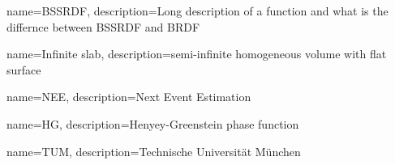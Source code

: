 {
    name={BSSRDF},
    description={Long description of a function and what is the differnce
    between BSSRDF and BRDF}
}

{
    name={Infinite slab},
    description={semi-infinite homogeneous volume with flat surface}
}

{
    name={NEE},
    description={Next Event Estimation}
}

{
    name={HG},
    description={Henyey-Greenstein phase function}
}

{
    name={TUM},
    description={Technische Universität München}
}
